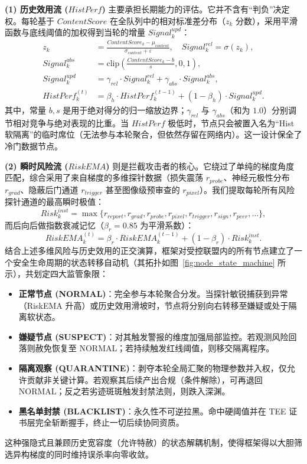 \documentclass[runningheads]{llncs}
\begin{document}
\textbf{(1) 历史效用流 ($HistPerf$)} 主要承担长期能力的评估。它并不含有“判负”决定权。每轮基于 $ContentScore$ 在全队列中的相对标准差分布（$z_k$ 分数），采用平滑函数与底线阈值的加权得到当轮的增量 $Signal_k^{upd}$：
\begin{align}
    z_{k} &= \frac{ContentScore_{k} - \mu_{content}}{\sigma_{content} + \varepsilon}, \quad Signal_{k}^{rel} = \sigma(z_{k}), \\
    Signal_{k}^{abs} &= \mathrm{clip}\left(\frac{ContentScore_{k} - b}{s}, 0, 1\right), \\
    Signal_{k}^{upd} &= \gamma_{rel} \cdot Signal_{k}^{rel} + \gamma_{abs} \cdot Signal_{k}^{abs}, \\
    HistPerf_{k}^{(t)} &= \beta_{h} \cdot HistPerf_{k}^{(t-1)} + (1 - \beta_{h}) \cdot Signal_{k}^{upd}.
\end{align}
其中，常量 $b, s$ 是用于绝对得分的归一缩放边界；$\gamma_{rel}$ 与 $\gamma_{abs}$（和为 $1.0$）分别调节相对竞争与绝对表现的比重。当 $HistPerf$ 极低时，节点只会被置入名为“Hist软隔离”的临时席位（无法参与本轮聚合，但依然存留在网络内）。这一设计保全了冷门数据节点。

\textbf{(2) 瞬时风险流 ($RiskEMA$)} 则是拦截攻击者的核心。它绕过了单纯的梯度角度匹配，综合采用了来自梯度的多维探针数据（损失震荡 $r_{probe}$、神经元极性分布 $r_{grad}$、隐蔽后门通道 $r_{trigger}$ 甚至图像级预审查的 $r_{pixel}$）。我们提取每轮所有风险探针通道的最高瞬时极值：
\begin{equation}
    Risk_{k}^{inst} = \max\{r_{report}, r_{grad}, r_{probe}, r_{pixel}, r_{trigger}, r_{sign}, r_{peer}, \dots \},
\end{equation}
而后向后做指数衰减记忆（$\beta_r = 0.85$ 为平滑系数）：
\begin{equation}
    RiskEMA_{k}^{(t)} = \beta_{r} \cdot RiskEMA_{k}^{(t-1)} + (1 - \beta_{r}) \cdot Risk_{k}^{inst}.
\end{equation}
结合上述多维风险与历史效用的正交演算，框架对受控联盟内的所有节点建立了一个安全生命周期的状态转移自动机（其拓扑如图~\ref{fig:node_state_machine} 所示），共划定四大监管象限：
\begin{itemize}
    \item \textbf{正常节点 (NORMAL)}：完全参与本轮聚合分发。当探针敏锐捕获到异常（RiskEMA 升高）或历史效用滑坡时，节点将分别向右转移至嫌疑或处于隔离软状态。
    \item \textbf{嫌疑节点 (SUSPECT)}：对其触发警报的维度加强局部监控。若观测风险回落则赦免恢复至 NORMAL；若持续触发红线阈值，则移交隔离程序。
    \item \textbf{隔离观察 (QUARANTINE)}：剥夺本轮全局汇聚的物理参数并入权，仅允许贡献非关键计算。若观察其后续产出合规（条件解除），可再退回 NORMAL；反之若劣迹斑斑触发封禁法则，则跌入深渊。
    \item \textbf{黑名单封禁 (BLACKLIST)}：永久性不可逆拉黑。命中硬阈值并在 TEE 证书层完全斩断握手，终止一切后续协同资质。
\end{itemize}
这种强隐式且兼顾历史宽容度（允许特赦）的状态解耦机制，使得框架得以大胆筛选异构梯度的同时维持误杀率向零收敛。
\end{document}

